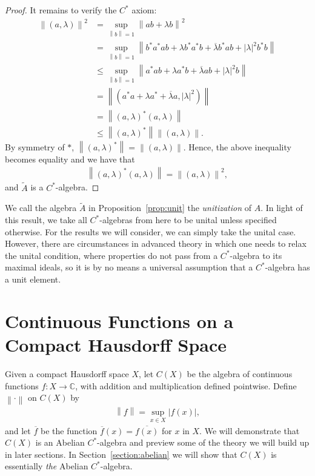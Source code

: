 \documentclass[11pt,a4paper]{report}
\theoremstyle{plain}
\theoremstyle{definition}
\newcommand{\1}{\mathbbm{1}}
\newcommand{\C}{\mathbb{C}}
\newcommand{\CX}{C(X)}
\begin{document}
\begin{proof}
	It remains to verify the $C^\ast$ axiom:
	\begin{align*}
				\left\|(a,\lambda)\right\|^2 
		&=		\sup_{\left\|b\right\|=1}{\left\| ab+\lambda b\right \|^2}						\\
		&=		\sup_{\left\|b\right\|=1}{\left\| b^\ast a^\ast ab 
								+\lambda b^\ast a^\ast b
								+\overline{\lambda}b^\ast a b 
								+|\lambda|^2 b^\ast b \right\|}									\\
		&\leq	\sup_{\left\|b\right\|=1}{\left\| a^\ast ab 
								+\lambda a^\ast b
								+\overline{\lambda}a b
								+\left|\lambda\right|^2 b\right\|}								\\
		&=		\left\|(a^\ast a + \lambda a^\ast +\overline{\lambda}a,|\lambda|^2)\right\|		\\
		&= 		\left\|(a,\lambda)^\ast(a,\lambda)\right\|										\\
		&\leq	\left\|(a,\lambda)^\ast\right\| \left\|(a,\lambda)\right\|.
	\end{align*}
	By symmetry of $\ast$, $\left\|(a,\lambda)^\ast\right\| = \left\|(a,\lambda)\right\|$. 
	Hence, the above inequality becomes equality and we have that
	\begin{align*}
		\left\|(a,\lambda)^\ast(a,\lambda)\right\| = \left\|(a,\lambda)\right\|^2,
	\end{align*}
	and $\tilde A$ is a $C^\ast$-algebra.
\end{proof}

We call the algebra $\tilde A$ in Proposition~\ref{prop:unit} the \emph{unitization} of $A$.
In light of this result, we take all $C^\ast$-algebras from here to be unital 
unless specified otherwise. For the results we will consider, we can simply take 
the unital case. However, there are circumstances in advanced theory in which 
one needs to relax the unital condition, where properties do not pass from a 
$C^\ast$-algebra to its maximal ideals, so it is by no means a universal 
assumption that a $C^\ast$-algebra has a unit element.


\section{Continuous Functions on a Compact Hausdorff Space} \label{section:CX}
Given a compact Hausdorff space $X$, let $\CX$ be the algebra of continuous 
functions $f:X\to\C$, with addition and multiplication defined pointwise. 
Define $\left\|\cdot\right\|$ on $\CX$ by
\begin{align*}
	\left\|f\right\|= \sup_{x\in X}{\left|f(x)\right|},
\end{align*}
and let $\overline f$ be the function $\overline f(x) = \overline{f(x)}$ for 
$x$ in $X$. We will demonstrate that $\CX$ is an Abelian $C^\ast$-algebra and 
preview some of the theory we will build up in later sections. In 
Section~\ref{section:abelian} we will show that $\CX$ is essentially \emph{the} 
Abelian $C^\ast$-algebra.
\end{document}
